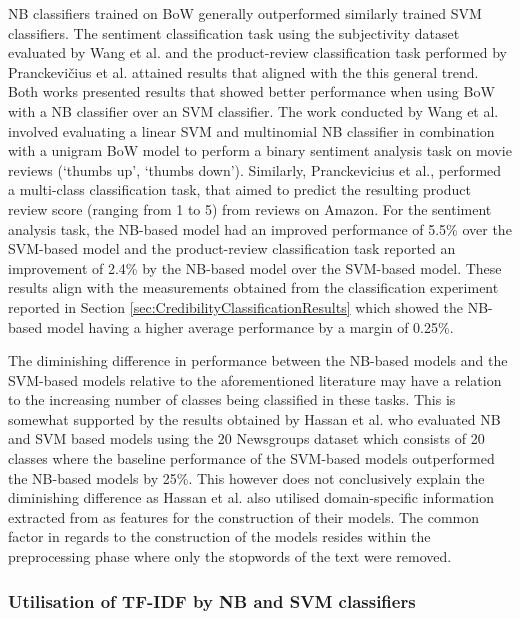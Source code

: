 \documentclass[a4paper,twoside,phd]{BYUPhys}
\begin{document}
NB classifiers trained on BoW generally outperformed similarly trained SVM classifiers. The sentiment classification task using the subjectivity dataset \cite{Pang2004} evaluated by Wang et al. \cite{Wang2012} and the product-review classification task performed by Pranckevičius et al. \cite{PRANCKEVICIUS2017} attained results that aligned with the this general trend. Both works presented results that showed better performance when using BoW with a NB classifier over an SVM classifier. The work conducted by Wang et al. involved evaluating a linear SVM and multinomial NB classifier in combination with a unigram BoW model to perform a binary sentiment analysis task on movie reviews (`thumbs up', `thumbs down'). Similarly, Pranckevicius et al., performed a multi-class classification task, that aimed to predict the resulting product review score (ranging from 1 to 5) from reviews on Amazon. For the sentiment analysis task, the NB-based model had an improved performance of 5.5\% over the SVM-based model and the product-review classification task reported an improvement of 2.4\% by the NB-based model over the SVM-based model. These results align with the measurements obtained from the classification experiment reported in Section \ref{sec:CredibilityClassificationResults} which showed the NB-based model having a higher average performance by a margin of 0.25\%. \newline

The diminishing difference in performance between the NB-based models and the SVM-based models relative to the aforementioned literature may have a relation to the increasing number of classes being classified in these tasks. This is somewhat supported by the results obtained by Hassan et al. \cite{Hassan} who evaluated NB and SVM based models using the 20 Newsgroups dataset \cite{Mitchell} which consists of 20 classes where the baseline performance of the SVM-based models outperformed the NB-based models by 25\%. This however does not conclusively explain the diminishing difference as Hassan et al. also utilised domain-specific information extracted from as features for the construction of their models. The common factor in regards to the construction of the models resides within the preprocessing phase where only the stopwords of the text were removed. \newline

\subsubsection{Utilisation of TF-IDF by NB and SVM classifiers}
\end{document}
